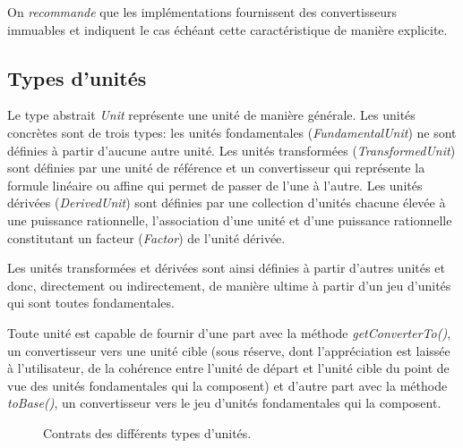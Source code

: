\documentclass[a4paper,draft,twoside,10pt]{article}
\begin{document}
On \emph{recommande} que les implémentations fournissent des convertisseurs immuables et indiquent le cas échéant cette
caractéristique de manière explicite.

\subsection{Types d'unités}

Le type abstrait \emph{Unit} représente une unité de manière générale. Les unités concrètes sont de trois types: les
unités fondamentales (\emph{FundamentalUnit}) ne sont définies à partir d'aucune autre unité. Les unités transformées
(\emph{TransformedUnit}) sont définies par une unité de référence et un convertisseur qui représente la formule linéaire
ou affine qui permet de passer de l'une à l'autre. Les unités dérivées (\emph{DerivedUnit}) sont définies par une
collection d'unités chacune élevée à une puissance rationnelle, l'association d'une unité et d'une puissance rationnelle
constitutant un facteur (\emph{Factor}) de l'unité dérivée.

Les unités transformées et dérivées sont ainsi définies à partir d'autres unités et donc, directement ou indirectement,
de manière ultime à partir d'un jeu d'unités qui sont toutes fondamentales.

Toute unité est capable de fournir d'une part avec la méthode \emph{getConverterTo​()}, un convertisseur vers une unité
cible (sous réserve, dont l'appréciation est laissée à l'utilisateur, de la cohérence entre l'unité de départ et l'unité
cible du point de vue des unités fondamentales qui la composent) et d'autre part avec la méthode \emph{toBase()},
un convertisseur vers le jeu d'unités fondamentales qui la composent.

\begin{figure}[!h]
\caption{Contrats des différents types d'unités.}
\end{figure}
\end{document}
